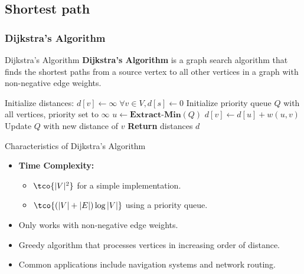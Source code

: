 \newpage
\subsection{Shortest path}
\subsubsection{Dijkstra's Algorithm}
\begin{definition}[]{Dijkstra's Algorithm}
    \textbf{Dijkstra's Algorithm} is a graph search algorithm that finds the shortest paths from a source vertex to all other vertices in a graph with non-negative edge weights.
\end{definition}

\begin{algorithm}
    \caption{Dijkstra's Algorithm}
    \begin{algorithmic}[1]
         
            \State Initialize distances: $d[v] \gets \infty \; \forall v \in V, d[s] \gets 0$
            \State Initialize priority queue $Q$ with all vertices, priority set to $\infty$
                \State $u \gets \textbf{Extract-Min}(Q)$
                     
                        \State $d[v] \gets d[u] + w(u, v)$
                        \State Update $Q$ with new distance of $v$
                    \EndIf
                \EndFor
            \EndWhile
            \State \textbf{Return} distances $d$
        \EndProcedure
    \end{algorithmic}
\end{algorithm}

\begin{properties}[]{Characteristics of Dijkstra's Algorithm}
    \begin{itemize}
        \item \textbf{Time Complexity:}
              \begin{itemize}
                  \item $\tco{|V|^2}$ for a simple implementation.
                  \item $\tco{(|V| + |E|) \log |V|}$ using a priority queue.
              \end{itemize}
        \item Only works with non-negative edge weights.
        \item Greedy algorithm that processes vertices in increasing order of distance.
        \item Common applications include navigation systems and network routing.
    \end{itemize}
\end{properties}

